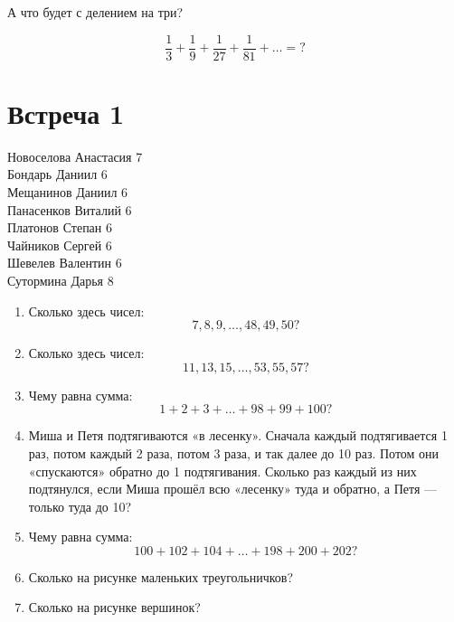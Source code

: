 \documentclass[a4paper, 12pt]{article}
\begin{document}
А что будет с делением на три?

\[
  \frac{1}{3} + \frac{1}{9} + \frac{1}{27} + \frac{1}{81} + \ldots = ?
\]


\section{Встреча 1}


Новоселова Анастасия 7 \\
Бондарь Даниил 6 \\
Мещанинов Даниил 6 \\
Панасенков Виталий 6 \\
Платонов Степан 6 \\
Чайников Сергей 6 \\
Шевелев Валентин 6 \\
Сутормина Дарья 8 \\

\newpage
\begin{enumerate}

  \item Сколько здесь чисел: 
    \[
    7, 8, 9, \ldots, 48, 49, 50?
  \]
  \item Сколько здесь чисел: 
    \[
      11, 13, 15, \ldots, 53, 55, 57?
    \]
  \item Чему равна сумма: 
    \[
    1 + 2 + 3 + \ldots + 98 + 99 + 100?
    \]
  \item Миша и Петя подтягиваются «в лесенку». Сначала каждый подтягивается 1 раз, потом каждый 2 раза, потом 3 раза, и так далее до 10 раз. Потом они «спускаются» обратно до 1 подтягивания. Сколько раз каждый из них подтянулся, если Миша прошёл всю «лесенку» туда и обратно, а Петя — только туда до 10?
  \item 
 Чему равна сумма: 
    \[
    100 + 102 + 104 + \ldots + 198 + 200 + 202?
    \]
  \item Сколько на рисунке маленьких треугольничков?


\newcommand*\rows{10}

  \item Сколько на рисунке вершинок?



\end{enumerate}
\end{document}

